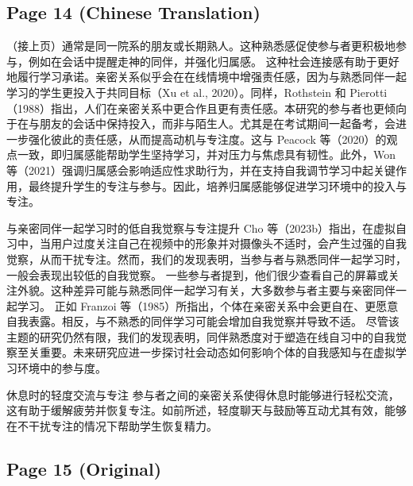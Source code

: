 \documentclass[12pt]{ctexart}
\begin{document}
\subsection*{Page 14 (Chinese Translation)}

（接上页）通常是同一院系的朋友或长期熟人。这种熟悉感促使参与者更积极地参与，例如在会话中提醒走神的同伴，并强化归属感。
这种社会连接感有助于更好地履行学习承诺。亲密关系似乎会在在线情境中增强责任感，因为与熟悉同伴一起学习的学生更投入于共同目标（Xu et al., 2020）。同样，Rothstein 和 Pierotti（1988）指出，人们在亲密关系中更合作且更有责任感。本研究的参与者也更倾向于在与朋友的会话中保持投入，而非与陌生人。尤其是在考试期间一起备考，会进一步强化彼此的责任感，从而提高动机与专注度。这与 Peacock 等（2020）的观点一致，即归属感能帮助学生坚持学习，并对压力与焦虑具有韧性。此外，Won 等（2021）强调归属感会影响适应性求助行为，并在支持自我调节学习中起关键作用，最终提升学生的专注与参与。因此，培养归属感能够促进学习环境中的投入与专注。

与亲密同伴一起学习时的低自我觉察与专注提升
Cho 等（2023b）指出，在虚拟自习中，当用户过度关注自己在视频中的形象并对摄像头不适时，会产生过强的自我觉察，从而干扰专注。然而，我们的发现表明，当参与者与熟悉同伴一起学习时，一般会表现出较低的自我觉察。
一些参与者提到，他们很少查看自己的屏幕或关注外貌。这种差异可能与熟悉同伴一起学习有关，大多数参与者主要与亲密同伴一起学习。
正如 Franzoi 等（1985）所指出，个体在亲密关系中会更自在、更愿意自我表露。相反，与不熟悉的同伴学习可能会增加自我觉察并导致不适。
尽管该主题的研究仍然有限，我们的发现表明，同伴熟悉度对于塑造在线自习中的自我觉察至关重要。未来研究应进一步探讨社会动态如何影响个体的自我感知与在虚拟学习环境中的参与度。

休息时的轻度交流与专注
参与者之间的亲密关系使得休息时能够进行轻松交流，这有助于缓解疲劳并恢复专注。如前所述，轻度聊天与鼓励等互动尤其有效，能够在不干扰专注的情况下帮助学生恢复精力。

\subsection*{Page 15 (Original)}
\end{document}
